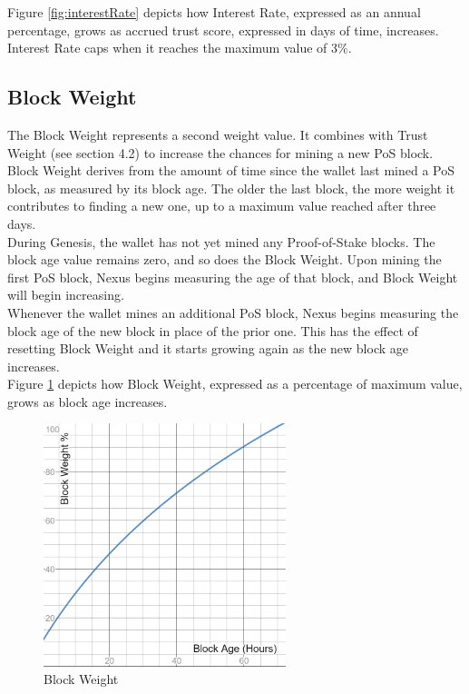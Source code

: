 \documentclass[11pt]{article}
\begin{document}
\noindent Figure \ref{fig:interestRate} depicts how Interest Rate, expressed as an annual percentage, grows as accrued trust score, expressed in days of time, increases. Interest Rate caps when it reaches the maximum value of 3\%.\\

\subsection{Block Weight}
The Block Weight represents a second weight value. It combines with Trust Weight (see section 4.2) to increase the chances for mining a new PoS block.\\

\noindent Block Weight derives from the amount of time since the wallet last mined a PoS block, as measured by its block age. The older the last block, the more weight it contributes to finding a new one, up to a maximum value reached after three days. \\

\noindent During Genesis, the wallet has not yet mined any Proof-of-Stake blocks. The block age value remains zero, and so does the Block Weight. Upon mining the first PoS block, Nexus begins measuring the age of that block, and Block Weight will begin increasing. \\

\noindent Whenever the wallet mines an additional PoS block, Nexus begins measuring the block age of the new block in place of the prior one. This has the effect of resetting Block Weight and it starts growing again as the new block age increases. \\

\noindent Figure \ref{fig:blockWeight} depicts how Block Weight, expressed as a percentage of maximum value, grows as block age increases.\\

\begin{figure}[h!]
    \centering
    \includegraphics[width=0.63\textwidth]{images/blockWeight.png}
    \caption{Block Weight \label{fig:blockWeight}}
\end{figure}
\end{document}
